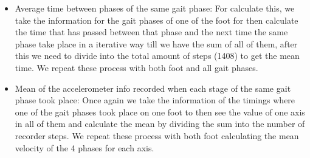 \begin{itemize}
    \item Average time between phases of the same gait phase: For calculate this, we take the information for the gait phases of one of the foot for then calculate the time that has passed between that phase and the next time the same phase take place in a iterative way till we have the sum of all of them, after this we need to divide into the total amount of steps (1408) to get the mean time. We repeat these process with both foot and all gait phases.
    \item Mean of the accelerometer info recorded when each stage of the same gait phase took place: Once again we take the information of the timings where one of the gait phases took place on one foot to then see the value of one axis in all of them and calculate the mean by dividing the sum into the number of recorder steps. We repeat these process with both foot calculating the mean velocity of the 4 phases for each axis.
\end{itemize}

\begin{table}[h!]
\centering
{}
\caption{Format of dataset for one research participant }
\label{table:Format of dataset for one research participant}
\end{table}


